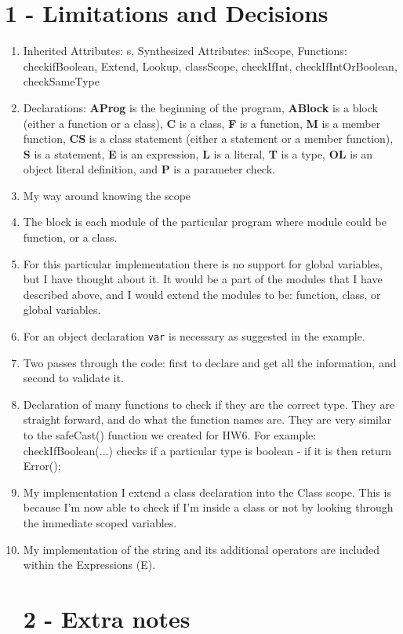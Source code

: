 \documentclass[11pt, oneside]{article}
\begin{document}
\section*{1 - Limitations and Decisions}
\begin{enumerate}
\item Inherited Attributes: s, Synthesized Attributes: inScope, Functions: checkifBoolean, Extend, Lookup, classScope, checkIfInt, checkIfIntOrBoolean, checkSameType
\item Declarations: \textbf{AProg} is the beginning of the program, \textbf{ABlock} is a block (either a function or a class), \textbf{C} is a class, \textbf{F} is a function, \textbf{M} is a member function, \textbf{CS} is a class statement (either a statement or a member function), \textbf{S} is a statement, \textbf{E} is an expression, \textbf{L} is a literal, \textbf{T} is a type, \textbf{OL} is an object literal definition, and \textbf{P} is a parameter check.
\item My way around knowing the scope 
\item The block is each module of the particular program where module could be function, or a class.
\item For this particular implementation there is no support for global variables, but I have thought about it. It would be a part of the modules that I have described above, and I would extend the modules to be: function, class, or global variables.
\item  For an object declaration \texttt{var} is necessary as suggested in the example.
\item Two passes through the code: first to declare and get all the information, and second to validate it.
\item Declaration of many functions to check if they are the correct type. They are straight forward, and do what the function names are. They are very similar to the safeCast() function we created for HW6. For example: checkIfBoolean(...) checks if a particular type is boolean - if it is then return Error();
\item My implementation I extend a class declaration into the Class scope. This is because I'm now able to check if I'm inside a class or not by looking through the immediate scoped variables.
\item My implementation of the string and its additional operators are included within the Expressions (E).

\section*{2 - Extra notes}


\end{enumerate}
\end{document}
